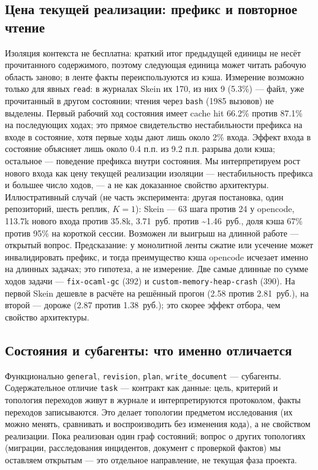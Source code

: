 \documentclass[11pt,a4paper]{article}
\begin{document}
\subsection{Цена текущей реализации: префикс и повторное чтение}

Изоляция контекста не бесплатна: краткий итог предыдущей единицы не несёт прочитанного
содержимого, поэтому следующая единица может читать рабочую область заново; в ленте факты
переиспользуются из кэша. Измерение возможно только для явных \texttt{read}: в журналах
Skein их 170, из них 9 (5.3\%) --- файл, уже прочитанный в другом состоянии; чтения через
\texttt{bash} (1985 вызовов) не выделены. Первый рабочий ход состояния имеет cache hit
66.2\% против 87.1\% на последующих ходах; это прямое свидетельство нестабильности префикса
на входе в состояние, хотя первые ходы дают лишь около 2\% входа. Эффект входа в
состояние объясняет лишь около 0.4 п.п. из 9.2 п.п. разрыва доли кэша; остальное ---
поведение префикса внутри состояния. Мы интерпретируем рост
нового входа как цену текущей реализации изоляции --- нестабильность префикса и большее
число ходов, --- а не как доказанное свойство архитектуры. Иллюстративный случай (не часть эксперимента:
другая постановка, один репозиторий, шесть реплик, $K=1$): Skein --- 63 шага против 24 у
opencode, 113.7k нового входа против 35.8k, 3.71~руб. против \textasciitilde1.46~руб.,
доля кэша 67\% против 95\% на короткой сессии. Возможен ли выигрыш на длинной работе ---
открытый вопрос. Предсказание: у монолитной ленты сжатие или усечение может инвалидировать
префикс, и тогда преимущество кэша opencode исчезает именно на длинных задачах; это
гипотеза, а не измерение. Две самые длинные по сумме ходов задачи --- \texttt{fix-ocaml-gc} (392) и
\texttt{custom-memory-heap-crash} (390). На первой Skein дешевле в расчёте на решённый
прогон (2.58 против 2.81~руб.), на второй --- дороже (2.87 против 1.38~руб.); это скорее
эффект отбора, чем свойство архитектуры.

\subsection{Состояния и субагенты: что именно отличается}

Функционально \texttt{general}, \texttt{revision}, \texttt{plan}, \texttt{write\_document}
--- субагенты. Содержательное отличие \texttt{task} --- контракт как данные: цель, критерий
и топология переходов живут в журнале и интерпретируются протоколом, факты переходов
записываются. Это делает топологии предметом исследования (их можно менять, сравнивать и
воспроизводить без изменения кода), а не свойством реализации. Пока реализован один
граф состояний; вопрос о других топологиях (миграции, расследования инцидентов, документ с
проверкой фактов) мы оставляем открытым --- это отдельное направление, не текущая фаза проекта.
\end{document}
